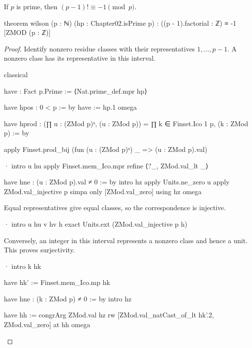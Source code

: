 \begin{theorem}
  \label{ent:thm:wilson}
  If $p$ is prime, then $(p-1)!
    \equiv-1\pmod p$.

  \begin{lean}
    theorem wilson (p : ℕ) (hp : Chapter02.isPrime p) :
        ((p - 1).factorial : ℤ) ≡ -1 [ZMOD (p : ℤ)]
  \end{lean}
\end{theorem}

\begin{proof}
  Identify nonzero residue classes with their representatives $1,\ldots,p-1$.
  A nonzero class has its representative in this interval.

  \begin{lean}
    classical

    have : Fact p.Prime := ⟨Nat.prime_def.mpr hp⟩

    have hpos : 0 < p := by
      have := hp.1
      omega

    have hprod : (∏ u : (ZMod p)ˣ, (u : ZMod p)) =
        ∏ k ∈ Finset.Ico 1 p, (k : ZMod p) := by

      apply Finset.prod_bij (fun (u : (ZMod p)ˣ) _ => (u : ZMod p).val)

      · intro u hu
        apply Finset.mem_Ico.mpr
        refine ⟨?_, ZMod.val_lt _⟩

        have hne : (u : ZMod p).val ≠ 0 := by
          intro hz
          apply Units.ne_zero u
          apply ZMod.val_injective p
          simpa only [ZMod.val_zero] using hz
        omega
  \end{lean}

  Equal representatives give equal classes, so the correspondence is injective.

  \begin{lean}
    · intro u hu v hv h
      exact Units.ext (ZMod.val_injective p h)
  \end{lean}

  Conversely, an integer in this interval represents a nonzero class and hence a unit.
  This proves surjectivity.

  \begin{lean}
    · intro k hk

      have hk' := Finset.mem_Ico.mp hk

      have hne : (k : ZMod p) ≠ 0 := by
        intro hz

        have hh := congrArg ZMod.val hz
        rw [ZMod.val_natCast_of_lt hk'.2, ZMod.val_zero] at hh
        omega


\end{lean}
\end{proof}
